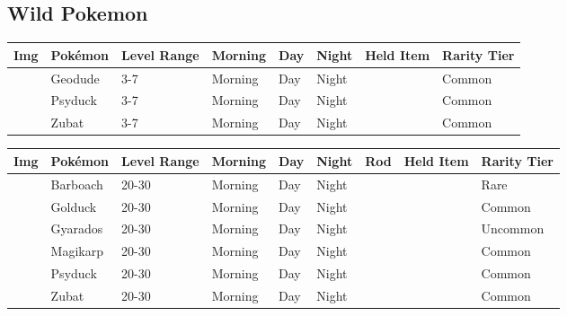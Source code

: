 \subsection{Wild Pokemon}%
\label{subsec:WildPokemon}%
\begin{longtable}{||l l l l l l l l||}%
\hline%
Img&Pokémon&Level Range&Morning&Day&Night&Held Item&Rarity Tier\\%
\hline%
\endhead%
\hline%
&Geodude&3{-}7&Morning&Day&Night&&Common\\%
\hline%
&Psyduck&3{-}7&Morning&Day&Night&&Common\\%
\hline%
&Zubat&3{-}7&Morning&Day&Night&&Common\\%
\hline%
\end{longtable}%
\begin{longtable}{||l l l l l l l l l||}%
\hline%
Img&Pokémon&Level Range&Morning&Day&Night&Rod&Held Item&Rarity Tier\\%
\hline%
\endhead%
\hline%
&Barboach&20{-}30&Morning&Day&Night&&&Rare\\%
\hline%
&Golduck&20{-}30&Morning&Day&Night&&&Common\\%
\hline%
&Gyarados&20{-}30&Morning&Day&Night&&&Uncommon\\%
\hline%
&Magikarp&20{-}30&Morning&Day&Night&&&Common\\%
\hline%
&Psyduck&20{-}30&Morning&Day&Night&&&Common\\%
\hline%
&Zubat&20{-}30&Morning&Day&Night&&&Common\\%
\hline%
\end{longtable}